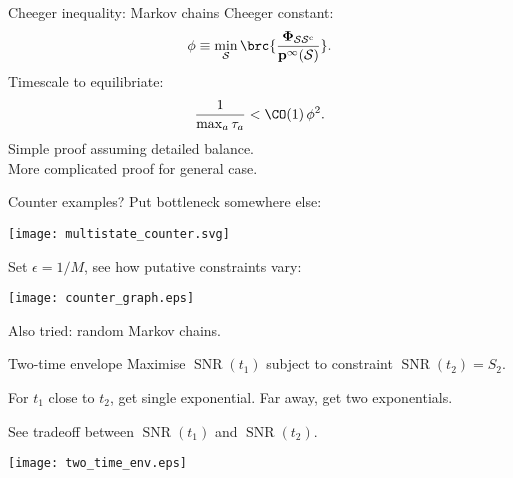 \documentclass{beamer}%
\DeclareMathOperator{\snr}{SNR}
\newcommand{\pr}{\mathbf{p}}
\newcommand{\eq}{\pr^\infty}
\newcommand{\F}{\boldsymbol{\Phi}}
\newcommand{\CS}{\mathcal{S}}
\newcommand{\comp}{^\mathrm{c}}
\begin{document}

\begin{frame}{Cheeger inequality: Markov chains}
%
 Cheeger constant:
 \begin{equation*}
   \phi \equiv \min_\CS \brc{\frac{\F_{\CS\CS\comp}}{\eq(\CS)}}.
 \end{equation*}
 Timescale to equilibriate:
 \begin{equation*}
   \frac{1}{\max_a\tau_a} < \CO(1)\, \phi^2.
 \end{equation*}
 Simple proof assuming detailed balance. \\
 More complicated proof for general case. 
%
\end{frame}


\begin{frame}{Counter examples?}
%
 Put bottleneck somewhere else:
 \begin{center}
   \texttt{[image: multistate\_counter.svg]}
 \end{center}
 Set $\epsilon = 1/M$, see how putative constraints vary:
 \begin{center}
   \texttt{[image: counter\_graph.eps]}
 \end{center}

 Also tried: random Markov chains.
%
\end{frame}


\begin{frame}{Two-time envelope}
%
 Maximise $\snr(t_1)$ subject to constraint $\snr(t_2)=S_2$.

 \vp For $t_1$ close to $t_2$, get single exponential. Far away, get two exponentials.

 \vp See tradeoff between $\snr(t_1)$ and $\snr(t_2)$.

 \begin{center}
   \texttt{[image: two\_time\_env.eps]}
 \end{center}
%
\end{frame}
\end{document}
